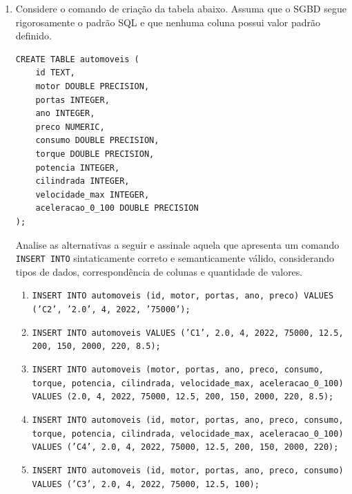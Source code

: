 \documentclass[12pt,a4paper]{article}
\newcommand{\resposta}[1]{
\noindent
\framebox[\textwidth]{
\begin{minipage}{0.98\textwidth}
\vspace{#1}
\end{minipage}
}
}
\begin{document}
\begin{enumerate}
\begin{center}
    \end{center}

    \resposta{8cm}
\item Considere o comando de criação da tabela abaixo. Assuma que o SGBD segue rigorosamente o padrão SQL e que nenhuma coluna possui valor padrão definido.

\begin{verbatim}
CREATE TABLE automoveis (
    id TEXT,
    motor DOUBLE PRECISION,
    portas INTEGER,
    ano INTEGER,
    preco NUMERIC,
    consumo DOUBLE PRECISION,
    torque DOUBLE PRECISION,
    potencia INTEGER,
    cilindrada INTEGER,
    velocidade_max INTEGER,
    aceleracao_0_100 DOUBLE PRECISION
);
\end{verbatim}

Analise as alternativas a seguir e assinale aquela que apresenta um comando \texttt{INSERT INTO} sintaticamente correto e semanticamente válido, considerando tipos de dados, correspondência de colunas e quantidade de valores.

\begin{enumerate}[label=\Alph*)]

    
    \item \texttt{INSERT INTO automoveis (id, motor, portas, ano, preco) VALUES ('C2', '2.0', 4, 2022, '75000');}
    \item \texttt{INSERT INTO automoveis VALUES ('C1', 2.0, 4, 2022, 75000, 12.5, 200, 150, 2000, 220, 8.5);}

    \item \texttt{INSERT INTO automoveis (motor, portas, ano, preco, consumo, torque, potencia, cilindrada, velocidade\_max, aceleracao\_0\_100) VALUES (2.0, 4, 2022, 75000, 12.5, 200, 150, 2000, 220, 8.5);}
    
    \item \texttt{INSERT INTO automoveis (id, motor, portas, ano, preco, consumo, torque, potencia, cilindrada, velocidade\_max, aceleracao\_0\_100) VALUES ('C4', 2.0, 4, 2022, 75000, 12.5, 200, 150, 2000, 220);}
    \item \texttt{INSERT INTO automoveis (id, motor, portas, ano, preco, consumo) VALUES ('C3', 2.0, 4, 2022, 75000, 12.5, 100);}



\end{enumerate}
\end{enumerate}
\end{document}

